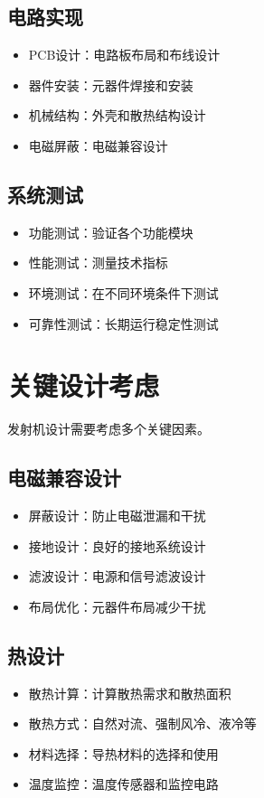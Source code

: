 \documentclass[12pt,UTF8]{ctexbook}
\begin{document}
\subsection{电路实现}
\begin{itemize}[leftmargin=3.5em]
    \item PCB设计：电路板布局和布线设计
    \item 器件安装：元器件焊接和安装
    \item 机械结构：外壳和散热结构设计
    \item 电磁屏蔽：电磁兼容设计
\end{itemize}

\subsection{系统测试}
\begin{itemize}[leftmargin=3.5em]
    \item 功能测试：验证各个功能模块
    \item 性能测试：测量技术指标
    \item 环境测试：在不同环境条件下测试
    \item 可靠性测试：长期运行稳定性测试
\end{itemize}

\section{关键设计考虑}

发射机设计需要考虑多个关键因素。

\subsection{电磁兼容设计}
\begin{itemize}[leftmargin=3.5em]
    \item 屏蔽设计：防止电磁泄漏和干扰
    \item 接地设计：良好的接地系统设计
    \item 滤波设计：电源和信号滤波设计
    \item 布局优化：元器件布局减少干扰
\end{itemize}

\subsection{热设计}
\begin{itemize}[leftmargin=3.5em]
    \item 散热计算：计算散热需求和散热面积
    \item 散热方式：自然对流、强制风冷、液冷等
    \item 材料选择：导热材料的选择和使用
    \item 温度监控：温度传感器和监控电路
\end{itemize}
\end{document}

